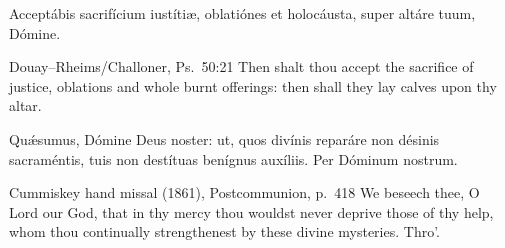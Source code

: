 Acceptábis sacrifícium iustítiæ, oblatiónes et holocáusta, super altáre tuum,
Dómine.
\finishfulltextelement
\begin{fulltextenglish}{Douay--Rheims/Challoner, Ps.~50:21}
Then shalt thou accept the sacrifice of justice, oblations and whole burnt
offerings: then shall they lay calves upon thy altar.
\end{fulltextenglish}

Qu\'{\ae}sumus, Dómine Deus noster: ut, quos divínis reparáre non désinis
sacraméntis, tuis non destítuas benígnus auxíliis. Per Dóminum nostrum.
\finishfulltextelement
\begin{fulltextenglish}{Cummiskey hand missal (1861), Postcommunion, p.~418}
We beseech thee, O Lord our God, that in thy mercy thou wouldst never deprive
those of thy help, whom thou continually strengthenest by these divine
mysteries. Thro'.
\end{fulltextenglish}
